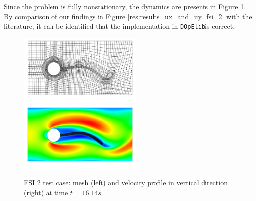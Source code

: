 \documentclass[prodmode,acmtoms]{acmsmall}
\numberwithin{equation}{section}
\newcommand{\dope}{\texttt{DOpElib}}
\begin{document}
Since the problem is fully nonstationary, the 
dynamics are presents in Figure \ref{res:fsi_2_mesh_and_x_velo}. 
By comparison of our findings in Figure \ref{res:results_ux_and_uy_fsi_2}
with the literature, it can be identified that 
the implementation in \dope is correct.



\begin{figure}[h]
\centering
{\includegraphics[width=6cm]{Pictures/visit_fsi_2_CNn_t_2e-2_global_3_biharmonic_mesh8070_scale.png}}
{\includegraphics[width=6cm]{Pictures/visit_fsi_2_CNn_t_2e-2_global_3_biharmonic_x_velo8070_scale.png}}
\caption{FSI 2 test case: mesh (left) and velocity profile in vertical 
direction (right) at time $t=16.14s$.}
\label{res:fsi_2_mesh_and_x_velo}
\end{figure}
\end{document}
